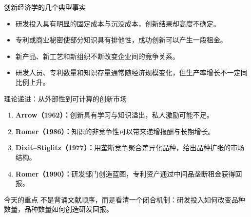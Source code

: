 \documentclass[aspectratio=32]{beamer}
\begin{document}
\begin{frame}{创新经济学的几个典型事实}
\small
\begin{itemize}
  \item 研发投入具有明显的固定成本与沉没成本，创新结果却高度不确定。
  \item 专利或商业秘密使部分知识具有排他性，成功创新可以产生一段租金。
  \item 新产品、新工艺和新组织不断改变企业间的竞争关系。
  \item 研发人员、专利数量和知识存量通常随经济规模变化，但生产率增长不一定同比例上升。
\end{itemize}
\vspace{0.15cm}
\begin{center}
\end{center}
\end{frame}

\begin{frame}{理论递进：从外部性到可计算的创新市场}
\small
\begin{enumerate}
  \item \textbf{Arrow（1962）：}创新具有学习与知识溢出，私人激励可能不足。
  \item \textbf{Romer（1986）：}知识的非竞争性可以带来递增报酬与长期增长。
  \item \textbf{Dixit--Stiglitz（1977）：}用垄断竞争聚合差异化品种，给出品种扩张的市场结构。
  \item \textbf{Romer（1990）：}研发部门创造蓝图，专利资产通过中间品垄断租金获得回报。
\end{enumerate}
\vspace{0.2cm}
\begin{block}{今天的重点}
不是背诵文献顺序，而是看清一个闭合机制：\alert{研发投入如何改变品种数量，品种数量如何创造研发回报。}
\end{block}
\end{frame}
\end{document}
